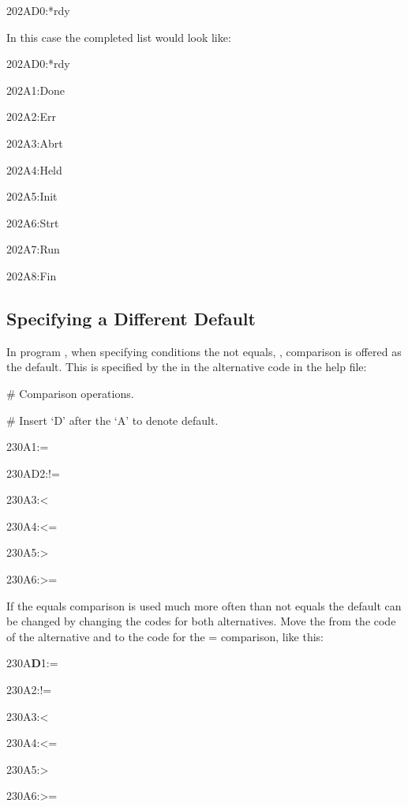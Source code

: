 \begin{expara}

202AD0:*rdy

\end{expara}

In this case the completed list would look like:

\begin{expara}

202AD0:*rdy

202A1:Done

202A2:Err

202A3:Abrt

202A4:Held

202A5:Init

202A6:Strt

202A7:Run

202A8:Fin

\end{expara}

\subsection{Specifying a Different Default}
In program \PrBtq, when specifying conditions the not equals, \exampletext{!=}, comparison is offered as the
default. This is specified by the  in the alternative code in the help file:

\begin{expara}

\# Comparison operations.

\# Insert `D' after the `A' to denote default.

230A1:=

230AD2:!=

230A3:{\textless}

230A4:{\textless}=

230A5:{\textgreater}

230A6:{\textgreater}=

\end{expara}

If the equals comparison is used much more often than not equals the
default can be changed by changing the codes for both alternatives.
Move the  from the code of the
\exampletext{!=} alternative and to the code for the =
comparison, like this:

\begin{expara}

230A\textbf{D}1:=

230A2:!=

230A3:{\textless}

230A4:{\textless}=

230A5:{\textgreater}

230A6:{\textgreater}=

\end{expara}

